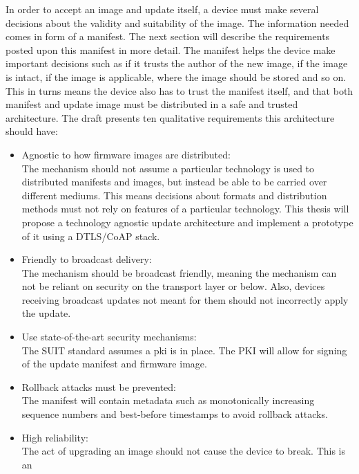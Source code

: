 \documentclass[0-thesis.tex]{subfiles}
\begin{document}
In order to accept an image and update itself, a device must make several decisions about
the validity and suitability of the image. The information needed comes in form of a
manifest. The next section will describe the requirements posted upon this manifest in
more detail. The manifest helps the device make important decisions such as if it trusts
the author of the new image, if the image is intact, if the image is applicable, where the
image should be stored and so on. This in turns means the device also has to trust the
manifest itself, and that both manifest and update image must be distributed in a safe and
trusted architecture. The draft \parencite{suit-architecture} presents ten qualitative
requirements this architecture should have:

\begin{itemize}
    \item Agnostic to how firmware images are distributed:\\
            The mechanism should not assume a particular technology is used to distributed
            manifests and images, but instead be able to be carried over different
            mediums. This means decisions about formats and distribution methods must not
            rely on features of a particular technology. This thesis will propose a
            technology agnostic update architecture and implement a prototype of it using
            a DTLS/CoAP stack.
    \item Friendly to broadcast delivery:\\
            The mechanism should be broadcast friendly, meaning the mechanism can not be
            reliant on security on the transport layer or below. Also, devices receiving
            broadcast updates not meant for them should not incorrectly apply the update.
    \item Use state-of-the-art security mechanisms:\\
            The SUIT standard assumes a \gls{pki} is in place. The PKI will allow for
            signing of the update manifest and firmware image.
    \item Rollback attacks must be prevented:\\
            The manifest will contain metadata such as monotonically increasing sequence
            numbers and best-before timestamps to avoid rollback attacks.
    \item High reliability:\\
            The act of upgrading an image should not cause the device to break. This is an

\end{itemize}
\end{document}
